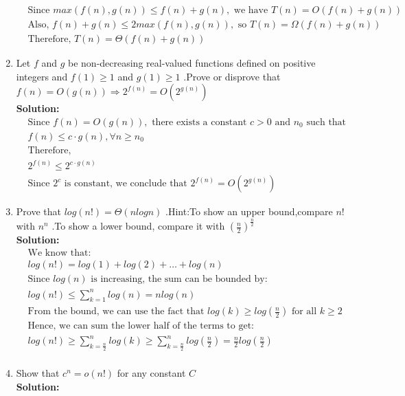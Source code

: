 \begin{enumerate}
\begin{align*}
        &\text{Since } max(f(n),g(n))\leq f(n)+g(n),\text{ we have } T(n)=O(f(n)+g(n))&\\
        &\text{Also, } f(n)+g(n)\leq 2max(f(n),g(n)),\text{ so } T(n)=\Omega(f(n)+g(n))&\\
        &\text{Therefore, } T(n)=\Theta(f(n)+g(n))&
    \end{align*}
    \item Let $f$ and $g$ be non-decreasing real-valued functions defined on positive integers and $f(1)\geq1$ and $g(1)\geq1$ .Prove or disprove that $f(n)=O(g(n))\Rightarrow2^{f(n)}=O(2^{g(n)})$
    \\\textbf{Solution:}
    \begin{align*}
        &\text{Since } f(n)=O(g(n)),\text{ there exists a constant }c>0 \text{ and } n_0 \text{ such that }&\\
        &f(n)\leq c\cdot g(n),\forall n\geq n_0&\\
        &\text{Therefore, }&\\
        &2^{f(n)}\leq2^{c\cdot g(n)}&\\
        &\text{Since }2^{c}\text{ is constant, we conclude that } 2^{f(n)}=O(2^{g(n)})&
    \end{align*}
    \item Prove that $log(n!)=\Theta(nlogn)$ .Hint:To show an upper bound,compare $n!$ with $n^{n}$ .To show a lower bound, compare it with $\left(\frac{n}{2}\right)^{\frac{n}{2}}$
    \\\textbf{Solution:}
    \begin{align*}
        &\text{We know that: }&\\
        &log(n!)=log(1)+log(2)+\ldots+log(n)&\\
        &\text{Since }log(n) \text{ is increasing, the sum can be bounded by:}&\\
        &log(n!)\leq \sum_{k=1}^{n}log(n)=nlog(n)&\\
        &\text{From the bound, we can use the fact that }log(k)\geq log(\frac{n}{2}) \text{ for all } k\geq2&\\
        &\text{Hence, we can sum the lower half of the terms to get:}&\\
        &log(n!)\geq \sum_{k=\frac{n}{2}}^{n}log(k)\geq \sum_{k=\frac{n}{2}}^{n}log(\frac{n}{2})=\frac{n}{2}log(\frac{n}{2})&\\
    \end{align*}
    \item Show that $c^{n}=o(n!)$ for any constant $C$
    \\\textbf{Solution:}

\end{enumerate}
